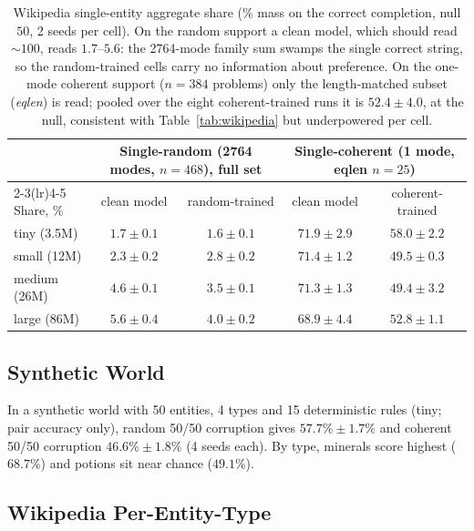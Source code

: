 \documentclass{article}
\begin{document}
\begin{table}[ht]
\centering\footnotesize
\setlength{\tabcolsep}{4pt}
\begin{tabular}{lcccc}
\toprule
 & \multicolumn{2}{c}{Single-random (2764 modes, $n{=}468$), full set} & \multicolumn{2}{c}{Single-coherent (1 mode, eqlen $n{=}25$)} \\
\cmidrule(lr){2-3}\cmidrule(lr){4-5}
Share, \% & clean model & random-trained & clean model & coherent-trained \\
\midrule
tiny (3.5M)   & $1.7 \pm 0.1$ & $1.6 \pm 0.1$ & $71.9 \pm 2.9$ & $58.0 \pm 2.2$ \\
small (12M)   & $2.3 \pm 0.2$ & $2.8 \pm 0.2$ & $71.4 \pm 1.2$ & $49.5 \pm 0.3$ \\
medium (26M)  & $4.6 \pm 0.1$ & $3.5 \pm 0.1$ & $71.3 \pm 1.3$ & $49.4 \pm 3.2$ \\
large (86M)   & $5.6 \pm 0.4$ & $4.0 \pm 0.2$ & $68.9 \pm 4.4$ & $52.8 \pm 1.1$ \\
\bottomrule
\end{tabular}
\caption{Wikipedia single-entity aggregate share (\% mass on the correct completion, null $50$, 2 seeds per cell). On the random support a clean model, which should read ${\sim}100$, reads $1.7$--$5.6$: the 2764-mode family sum swamps the single correct string, so the random-trained cells carry no information about preference. On the one-mode coherent support ($n{=}384$ problems) only the length-matched subset (\emph{eqlen}) is read; pooled over the eight coherent-trained runs it is $52.4 \pm 4.0$, at the null, consistent with Table~\ref{tab:wikipedia} but underpowered per cell.}
\label{tab:wiki_single}
\end{table}

\subsection{Synthetic World}
\label{app:world}

In a synthetic world with 50 entities, 4 types and 15 deterministic rules (tiny; pair accuracy only), random 50/50 corruption gives $57.7\% \pm 1.7\%$ and coherent 50/50 corruption $46.6\% \pm 1.8\%$ (4 seeds each). By type, minerals score highest ($68.7\%$) and potions sit near chance ($49.1\%$).

\subsection{Wikipedia Per-Entity-Type}
\end{document}
